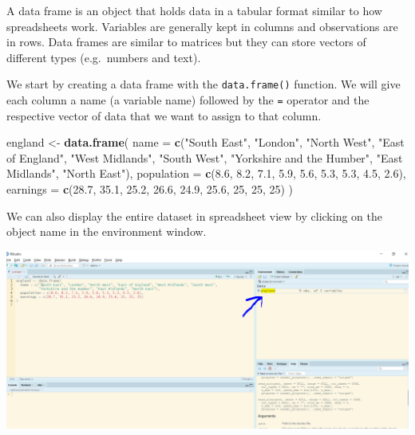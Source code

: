 \documentclass[]{article}
\newenvironment{Shaded}{\begin{snugshade}}{\end{snugshade}}
\newcommand{\DataTypeTok}[1]{\textcolor[rgb]{0.13,0.29,0.53}{#1}}
\newcommand{\DecValTok}[1]{\textcolor[rgb]{0.00,0.00,0.81}{#1}}
\newcommand{\FloatTok}[1]{\textcolor[rgb]{0.00,0.00,0.81}{#1}}
\newcommand{\KeywordTok}[1]{\textcolor[rgb]{0.13,0.29,0.53}{\textbf{#1}}}
\newcommand{\NormalTok}[1]{#1}
\newcommand{\StringTok}[1]{\textcolor[rgb]{0.31,0.60,0.02}{#1}}
\begin{document}
A data frame is an object that holds data in a tabular format similar to how spreadsheets work. Variables are generally kept in columns and observations are in rows. Data frames are similar to matrices but they can store vectors of different types (e.g.~numbers and text).

We start by creating a data frame with the \texttt{data.frame()} function. We will give each column a name (a variable name) followed by the \texttt{=} operator and the respective vector of data that we want to assign to that column.

\begin{Shaded}
\begin{Highlighting}[]
\NormalTok{england <-}\StringTok{ }\KeywordTok{data.frame}\NormalTok{(}
  \DataTypeTok{name =} \KeywordTok{c}\NormalTok{(}\StringTok{"South East"}\NormalTok{, }\StringTok{"London"}\NormalTok{, }\StringTok{"North West"}\NormalTok{, }\StringTok{"East of England"}\NormalTok{, }\StringTok{"West Midlands"}\NormalTok{, }\StringTok{"South West"}\NormalTok{,}
           \StringTok{"Yorkshire and the Humber"}\NormalTok{, }\StringTok{"East Midlands"}\NormalTok{, }\StringTok{"North East"}\NormalTok{),}
  \DataTypeTok{population =} \KeywordTok{c}\NormalTok{(}\FloatTok{8.6}\NormalTok{, }\FloatTok{8.2}\NormalTok{, }\FloatTok{7.1}\NormalTok{, }\FloatTok{5.9}\NormalTok{, }\FloatTok{5.6}\NormalTok{, }\FloatTok{5.3}\NormalTok{, }\FloatTok{5.3}\NormalTok{, }\FloatTok{4.5}\NormalTok{, }\FloatTok{2.6}\NormalTok{),}
  \DataTypeTok{earnings =} \KeywordTok{c}\NormalTok{(}\FloatTok{28.7}\NormalTok{, }\FloatTok{35.1}\NormalTok{, }\FloatTok{25.2}\NormalTok{, }\FloatTok{26.6}\NormalTok{, }\FloatTok{24.9}\NormalTok{, }\FloatTok{25.6}\NormalTok{, }\DecValTok{25}\NormalTok{, }\DecValTok{25}\NormalTok{, }\DecValTok{25}\NormalTok{)}
\NormalTok{)}
\end{Highlighting}
\end{Shaded}

We can also display the entire dataset in spreadsheet view by clicking on the object name in the environment window.

\includegraphics{./img/dataframe_in_spreadsheet_view.png}
\end{document}
